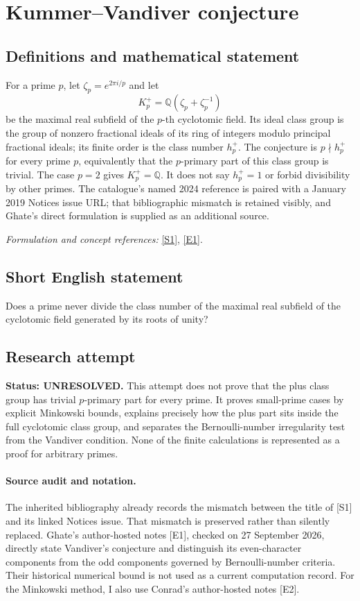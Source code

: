\documentclass[11pt]{article}
\begin{document}
\section*{\texorpdfstring{Kummer–Vandiver conjecture}{Kummer–Vandiver conjecture}}\label{9400055}
\subsection{Definitions and mathematical statement}
For a prime $p$, let $\zeta_p=e^{2\pi i/p}$ and let
\[
 K_p^+={\mathbb{Q}}(\zeta_p+\zeta_p^{-1})
\]
be the maximal real subfield of the $p$-th cyclotomic field. Its ideal class group is the group of nonzero fractional ideals of its ring of integers modulo principal fractional ideals; its finite order is the class number $h_p^+$. The conjecture is $p\nmid h_p^+$ for every prime $p$, equivalently that the $p$-primary part of this class group is trivial. The case $p=2$ gives $K_p^+={\mathbb{Q}}$. It does not say $h_p^+=1$ or forbid divisibility by other primes. The catalogue's named 2024 reference is paired with a January 2019 Notices issue URL; that bibliographic mismatch is retained visibly, and Ghate's direct formulation is supplied as an additional source.
\par\smallskip\textit{Formulation and concept references:} \href{https://www.ams.org/journals/notices/201901/201901FullIssue.pdf}{[S1]}, \href{https://mathweb.tifr.res.in/~eghate/vandiver.pdf}{[E1]}.

\subsection{Short English statement}
Does a prime never divide the class number of the maximal real subfield of the cyclotomic field generated by its roots of unity?
\subsection{Research attempt}
\textbf{Status: UNRESOLVED.} This attempt does not prove that the plus class group has trivial $p$-primary part for every prime. It proves small-prime cases by explicit Minkowski bounds, explains precisely how the plus part sits inside the full cyclotomic class group, and separates the Bernoulli-number irregularity test from the Vandiver condition. None of the finite calculations is represented as a proof for arbitrary primes.

\paragraph{Source audit and notation.}
The inherited bibliography already records the mismatch between the title of [S1] and its linked Notices issue. That mismatch is preserved rather than silently replaced. Ghate's author-hosted notes [E1], checked on 27 September 2026, directly state Vandiver's conjecture and distinguish its even-character components from the odd components governed by Bernoulli-number criteria. Their historical numerical bound is not used as a current computation record. For the Minkowski method, I also use Conrad's author-hosted notes [E2].
\end{document}

